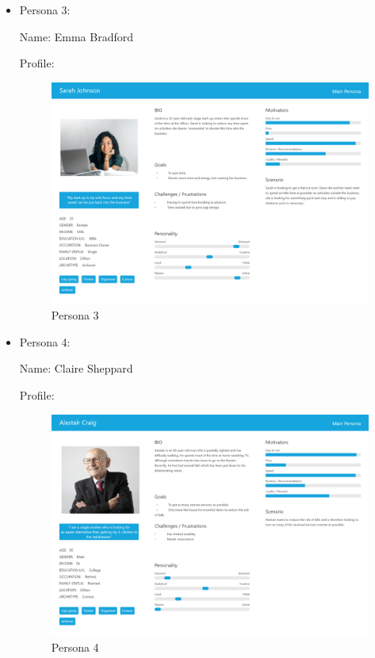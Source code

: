 \documentclass[12pt]{article}
\begin{document}
\begin{itemize}
		\item Persona 3:
		
		Name: Emma Bradford
		
		Profile: 
		\begin{figure}[H]
			
			\includegraphics[scale=0.2]{images/persona_1.png}
			\caption{Persona 3}
			\label{fig:persona_3}
		\end{figure}
		
		\item Persona 4:
		
		Name:  Claire Sheppard
		
		
		Profile: 
		\begin{figure}[H]
			
			\includegraphics[scale=0.2]{images/persona_4.png}
			\caption{Persona 4}
			\label{fig:persona_4}
		\end{figure}
		
	\end{itemize}
	
\end{document}

